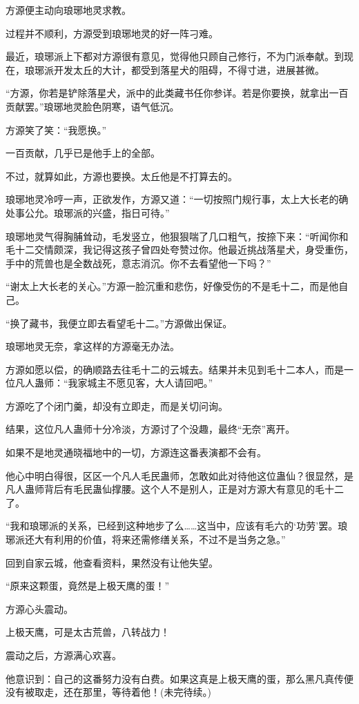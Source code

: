 \begin{this_body}
方源便主动向琅琊地灵求教。

过程并不顺利，方源受到琅琊地灵的好一阵刁难。

最近，琅琊派上下都对方源很有意见，觉得他只顾自己修行，不为门派奉献。到现在，琅琊派开发太丘的大计，都受到落星犬的阻碍，不得寸进，进展甚微。

“方源，你若是铲除落星犬，派中的此类藏书任你参详。若是你要换，就拿出一百贡献罢。”琅琊地灵脸色阴寒，语气低沉。

方源笑了笑：“我愿换。”

一百贡献，几乎已是他手上的全部。

不过，就算如此，方源也要换。太丘他是不打算去的。

琅琊地灵冷哼一声，正欲发作，方源又道：“一切按照门规行事，太上大长老的确处事公允。琅琊派的兴盛，指日可待。”

琅琊地灵气得胸脯耸动，毛发竖立，他狠狠喘了几口粗气，按捺下来：“听闻你和毛十二交情颇深，我记得这孩子曾四处夸赞过你。他最近挑战落星犬，身受重伤，手中的荒兽也是全数战死，意志消沉。你不去看望他一下吗？”

“谢太上大长老的关心。”方源一脸沉重和悲伤，好像受伤的不是毛十二，而是他自己。

“换了藏书，我便立即去看望毛十二。”方源做出保证。

琅琊地灵无奈，拿这样的方源毫无办法。

方源如愿以偿，的确顺路去往毛十二的云城去。结果并未见到毛十二本人，而是一位凡人蛊师：“我家城主不愿见客，大人请回吧。”

方源吃了个闭门羹，却没有立即走，而是关切问询。

结果，这位凡人蛊师十分冷淡，方源讨了个没趣，最终“无奈”离开。

如果不是地灵通晓福地中的一切，方源连这番表演都不会有。

他心中明白得很，区区一个凡人毛民蛊师，怎敢如此对待他这位蛊仙？很显然，是凡人蛊师背后有毛民蛊仙撑腰。这个人不是别人，正是对方源大有意见的毛十二了。

“我和琅琊派的关系，已经到这种地步了么……这当中，应该有毛六的‘功劳’罢。琅琊派还大有利用的价值，将来还需修缮关系，不过不是当务之急。”

回到自家云城，他查看资料，果然没有让他失望。

“原来这颗蛋，竟然是上极天鹰的蛋！”

方源心头震动。

上极天鹰，可是太古荒兽，八转战力！

震动之后，方源满心欢喜。

他意识到：自己的这番努力没有白费。如果这真是上极天鹰的蛋，那么黑凡真传便没有被取走，还在那里，等待着他！(未完待续。)

\end{this_body}


